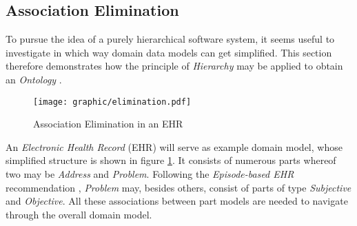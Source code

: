 %
%
%
%
%
%
%

\subsection{Association Elimination}
\label{association_elimination_heading}

To pursue the idea of a purely hierarchical software system, it seems useful to
investigate in which way domain data models can get simplified. This section
therefore demonstrates how the principle of \emph{Hierarchy} may be applied to
obtain an \emph{Ontology} \cite{hellerkunze}.

\begin{figure}[ht]
    \begin{center}
        \texttt{[image: graphic/elimination.pdf]}
        \caption{Association Elimination in an EHR}
        \label{elimination_figure}
    \end{center}
\end{figure}

An \emph{Electronic Health Record} (EHR) will serve as example domain model,
whose simplified structure is shown in figure \ref{elimination_figure}. It
consists of numerous parts whereof two may be \emph{Address} and \emph{Problem}.
Following the \emph{Episode-based EHR} recommendation \cite{westerhof},
\emph{Problem} may, besides others, consist of parts of type \emph{Subjective}
and \emph{Objective}. All these associations between part models are needed to
navigate through the overall domain model.

